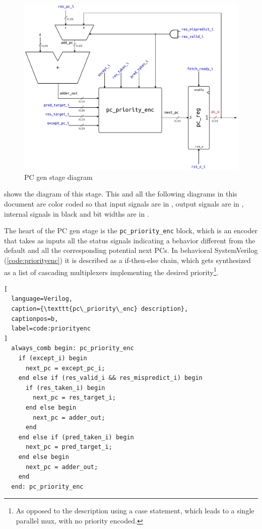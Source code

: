 \begin{figure}[hbt]
  \centering
  \includegraphics[width=\textwidth]{img/pc_gen_stage.pdf}
  \caption{\acs{PC} gen stage diagram}
  \label{fig:pc_gen_stage}
\end{figure}
 shows the diagram of this stage. This and all the following diagrams in this document are color coded so that input signals are in {\color{input_blue}{blue}}, output signals are in {\color{output_red}{red}}, internal signals in black and bit widths are in {\color{width_gray}{gray}}.

The heart of the \ac{PC} gen stage is the \texttt{pc\_priority\_enc} block, which is an encoder that takes as inputs all the status signals indicating a behavior different from the default and all the corresponding potential next \acp{PC}. In behavioral SystemVerilog (\cref{code:priorityenc}) it is described as a if-then-else chain, which gets synthesized as a list of cascading multiplexers implementing the desired priority\footnote{As opposed to the description using a case statement, which leads to a single parallel mux, with no priority encoded.}.
\begin{lstlisting}[
  language=Verilog,
  caption={\texttt{pc\_priority\_enc} description},
  captionpos=b,
  label=code:priorityenc
]
  always_comb begin: pc_priority_enc
    if (except_i) begin
      next_pc = except_pc_i;
    end else if (res_valid_i && res_mispredict_i) begin
      if (res_taken_i) begin
        next_pc = res_target_i;
      end else begin
        next_pc = adder_out;
      end
    end else if (pred_taken_i) begin
      next_pc = pred_target_i;
    end else begin
      next_pc = adder_out;
    end
  end: pc_priority_enc
\end{lstlisting}


